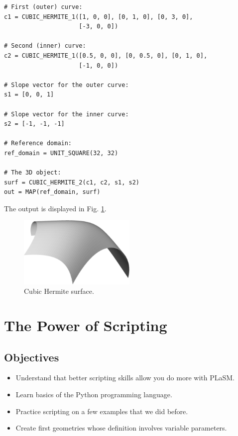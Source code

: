 \begin{bbox}
\begin{verbatim}
# First (outer) curve:
c1 = CUBIC_HERMITE_1([1, 0, 0], [0, 1, 0], [0, 3, 0], 
                     [-3, 0, 0])

# Second (inner) curve:
c2 = CUBIC_HERMITE_1([0.5, 0, 0], [0, 0.5, 0], [0, 1, 0], 
                     [-1, 0, 0])

# Slope vector for the outer curve:
s1 = [0, 0, 1]

# Slope vector for the inner curve:
s2 = [-1, -1, -1]

# Reference domain:
ref_domain = UNIT_SQUARE(32, 32)

# The 3D object:
surf = CUBIC_HERMITE_2(c1, c2, s1, s2)
out = MAP(ref_domain, surf)
\end{verbatim}
\end{bbox}
\vspace{6mm}

\noindent
The output is displayed in Fig. \ref{fig:curves-14}.\\

\begin{figure}[!ht]
\begin{center}
\includegraphics[width=0.5\textwidth]{img/curves-14.png}
\end{center}
\vspace{-4mm}
\caption{Cubic Hermite surface.}
\label{fig:curves-14}
\end{figure}
\noindent


\section{The Power of Scripting}

\subsection{Objectives}
\begin{itemize}
\item Understand that better scripting skills allow you do more with PLaSM.
\item Learn basics of the Python programming language.
\item Practice scripting on a few examples that we did before.
\item Create first geometries whose definition involves variable parameters.
\end{itemize}

